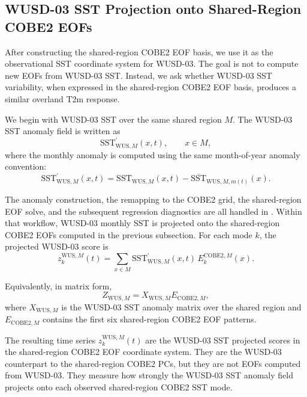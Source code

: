 \documentclass[11pt]{article}
\newcommand{\sst}{\mathrm{SST}}
\begin{document}
\subsection{WUSD-03 SST Projection onto Shared-Region COBE2 EOFs}
\label{subsec:wusd3_projection_sharedregion_cobe2_eofs}

After constructing the shared-region COBE2 EOF basis, we use it as the observational SST
coordinate system for WUSD-03. The goal is not to compute new EOFs from WUSD-03 SST. Instead, we
ask whether WUSD-03 SST variability, when expressed in the shared-region COBE2 EOF basis, produces
a similar overland T2m response.

We begin with WUSD-03 SST over the same shared region $M$. The WUSD-03 SST anomaly field is
written as
\begin{equation}
\sst_{\mathrm{WUS},M}^{\prime}(x,t),
\qquad x \in M,
\end{equation}
where the monthly anomaly is computed using the same month-of-year anomaly convention:
\begin{equation}
\sst_{\mathrm{WUS},M}^{\prime}(x,t)
=
\sst_{\mathrm{WUS},M}(x,t)
- \overline{\sst}_{\mathrm{WUS},M,m(t)}(x).
\label{eq:wus_sharedregion_anomaly}
\end{equation}

The anomaly construction, the remapping to the COBE2 grid, the shared-region EOF solve, and the
subsequent regression diagnostics are all handled in
. Within that
workflow, WUSD-03 monthly SST is projected onto the shared-region COBE2 EOFs computed in the
previous subsection. For each mode $k$, the projected WUSD-03 score is
\begin{equation}
z^{\mathrm{WUS},M}_{k}(t)
=
\sum_{x \in M}
\sst_{\mathrm{WUS},M}^{\prime}(x,t)\,E^{\mathrm{COBE2},M}_{k}(x).
\label{eq:wus_projected_sharedregion_pc}
\end{equation}

Equivalently, in matrix form,
\begin{equation}
Z_{\mathrm{WUS},M}
=
X_{\mathrm{WUS},M}
E_{\mathrm{COBE2},M},
\label{eq:wus_projected_sharedregion_matrix}
\end{equation}
where $X_{\mathrm{WUS},M}$ is the WUSD-03 SST anomaly matrix over the shared region and
$E_{\mathrm{COBE2},M}$ contains the first six shared-region COBE2 EOF patterns.

The resulting time series $z^{\mathrm{WUS},M}_{k}(t)$ are the WUSD-03 SST projected scores in the
shared-region COBE2 EOF coordinate system. They are the WUSD-03 counterpart to the shared-region
COBE2 PCs, but they are not EOFs computed from WUSD-03. They measure how strongly the WUSD-03 SST
anomaly field projects onto each observed shared-region COBE2 SST mode.
\end{document}
